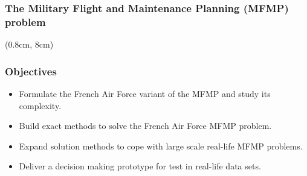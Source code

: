 \begin{frame}[t]
\frametitle{\textbf{The Military Flight and Maintenance Planning (MFMP) problem}}
  \begin{tikzpicture}
    
  \end{tikzpicture}

  \begin{textblock*}{\textwidth}(0.8cm, 8cm)
    \begin{flushleft}
    \end{flushleft}
  \end{textblock*}
\end{frame}

\begin{frame}
\frametitle{\textbf{Objectives}}
  \begin{itemize}[<+->]
  \item 
    Formulate the French Air Force variant of the MFMP and study its complexity.
  \item
    Build exact methods to solve the French Air Force MFMP problem.
  \item
    Expand solution methods to cope with large scale real-life MFMP problems.
  \item
    Deliver a decision making prototype for test in real-life data sets.
  \end{itemize}
\end{frame}
 

  




